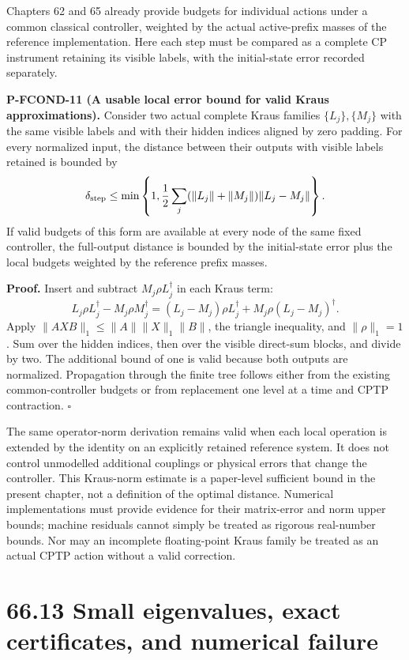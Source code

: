 \documentclass[
  11pt,
  oneside]{book}
\begin{document}
Chapters 62 and 65 already provide budgets for individual actions under
a common classical controller, weighted by the actual active-prefix
masses of the reference implementation. Here each step must be compared
as a complete CP instrument retaining its visible labels, with the
initial-state error recorded separately.

\label{p-fcond-11}{} \textbf{P-FCOND-11 (A usable local
error bound for valid Kraus approximations).} Consider two actual
complete Kraus families \(\{L_j\},\{M_j\}\) with the same visible labels
and with their hidden indices aligned by zero padding. For every
normalized input, the distance between their outputs with visible labels
retained is bounded by \[
\delta_{\rm step}\le\min\left\{1,
\frac12\sum_j(\|L_j\|+\|M_j\|)\|L_j-M_j\|\right\}.
\] If valid budgets of this form are available at every node of the same
fixed controller, the full-output distance is bounded by the
initial-state error plus the local budgets weighted by the reference
prefix masses.

\textbf{Proof.} Insert and subtract \(M_j\rho L_j^{\dagger}\) in each
Kraus term: \[
L_j\rho L_j^{\dagger}-M_j\rho M_j^{\dagger}
=(L_j-M_j)\rho L_j^{\dagger}
+M_j\rho(L_j-M_j)^{\dagger}.
\] Apply \(\|AXB\|_1\le\|A\|\|X\|_1\|B\|\), the triangle inequality, and
\(\|\rho\|_1=1\). Sum over the hidden indices, then over the visible
direct-sum blocks, and divide by two. The additional bound of one is
valid because both outputs are normalized. Propagation through the
finite tree follows either from the existing common-controller budgets
or from replacement one level at a time and CPTP contraction.
\(\square\)

The same operator-norm derivation remains valid when each local
operation is extended by the identity on an explicitly retained
reference system. It does not control unmodelled additional couplings or
physical errors that change the controller. This Kraus-norm estimate is
a paper-level sufficient bound in the present chapter, not a definition
of the optimal distance. Numerical implementations must provide evidence
for their matrix-error and norm upper bounds; machine residuals cannot
simply be treated as rigorous real-number bounds. Nor may an incomplete
floating-point Kraus family be treated as an actual CPTP action without
a valid correction.

\section{66.13 Small eigenvalues, exact certificates, and numerical
failure}
\end{document}
